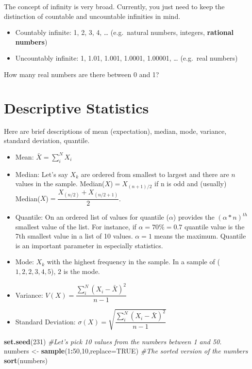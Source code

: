 \documentclass[]{book}
\newenvironment{Shaded}{\begin{snugshade}}{\end{snugshade}}
\newcommand{\CommentTok}[1]{\textcolor[rgb]{0.56,0.35,0.01}{\textit{#1}}}
\newcommand{\DataTypeTok}[1]{\textcolor[rgb]{0.13,0.29,0.53}{#1}}
\newcommand{\DecValTok}[1]{\textcolor[rgb]{0.00,0.00,0.81}{#1}}
\newcommand{\KeywordTok}[1]{\textcolor[rgb]{0.13,0.29,0.53}{\textbf{#1}}}
\newcommand{\NormalTok}[1]{#1}
\newcommand{\OperatorTok}[1]{\textcolor[rgb]{0.81,0.36,0.00}{\textbf{#1}}}
\newcommand{\OtherTok}[1]{\textcolor[rgb]{0.56,0.35,0.01}{#1}}
\newcommand{\StringTok}[1]{\textcolor[rgb]{0.31,0.60,0.02}{#1}}
\providecommand{\tightlist}{%
  \setlength{\itemsep}{0pt}\setlength{\parskip}{0pt}}
\theoremstyle{definition}
\theoremstyle{definition}
\theoremstyle{definition}
\theoremstyle{remark}
\begin{document}
The concept of infinity is very broad. Currently, you just need to keep
the distinction of countable and uncountable infinities in mind.

\begin{itemize}
\tightlist
\item
  Countably infinite: 1, 2, 3, 4, \ldots{} (e.g.~natural numbers,
  integers, \textbf{rational numbers})
\item
  Uncountably infinite: 1, 1.01, 1.001, 1.0001, 1.00001, \ldots{}
  (e.g.~real numbers)
\end{itemize}

How many real numbers are there between 0 and 1?

\hypertarget{descriptive-statistics}{%
\section{Descriptive Statistics}\label{descriptive-statistics}}

Here are brief descriptions of mean (expectation), median, mode,
variance, standard deviation, quantile.

\begin{itemize}
\item
  Mean: \(\bar{X} = \sum_i^N X_i\)
\item
  Median: Let's say \(X_k\) are ordered from smallest to largest and
  there are \(n\) values in the sample. Median(\(X\))\(=X_{(n+1)/2}\) if
  n is odd and (usually)
  Median(\(X\))\(=\dfrac{X_{(n/2)} + X_{(n/2+1)}}{2}\).
\item
  Quantile: On an ordered list of values for quantile (\(\alpha\))
  provides the \((\alpha*n)^{th}\) smallest value of the list. For
  instance, if \(\alpha = 70\% = 0.7\) quantile value is the 7th
  smallest value in a list of 10 values. \(\alpha = 1\) means the
  maximum. Quantile is an important parameter in especially statistics.
\item
  Mode: \(X_k\) with the highest frequency in the sample. In a sample of
  (\(1,2,2,3,4,5\)), \(2\) is the mode.
\item
  Variance: \(V(X) = \dfrac{\sum_i^N (X_i - \bar{X})^2}{n-1}\)
\item
  Standard Deviation:
  \(\sigma(X) = \sqrt{\dfrac{\sum_i^N (X_i - \bar{X})^2}{n-1}}\)
\end{itemize}

\begin{Shaded}
\begin{Highlighting}[]
\KeywordTok{set.seed}\NormalTok{(}\DecValTok{231}\NormalTok{)}
\CommentTok{#Let's pick 10 values from the numbers between 1 and 50.}
\NormalTok{numbers <-}\StringTok{ }\KeywordTok{sample}\NormalTok{(}\DecValTok{1}\OperatorTok{:}\DecValTok{50}\NormalTok{,}\DecValTok{10}\NormalTok{,}\DataTypeTok{replace=}\OtherTok{TRUE}\NormalTok{)}
\CommentTok{#The sorted version of the numbers}
\KeywordTok{sort}\NormalTok{(numbers)}
\end{Highlighting}
\end{Shaded}
\end{document}
